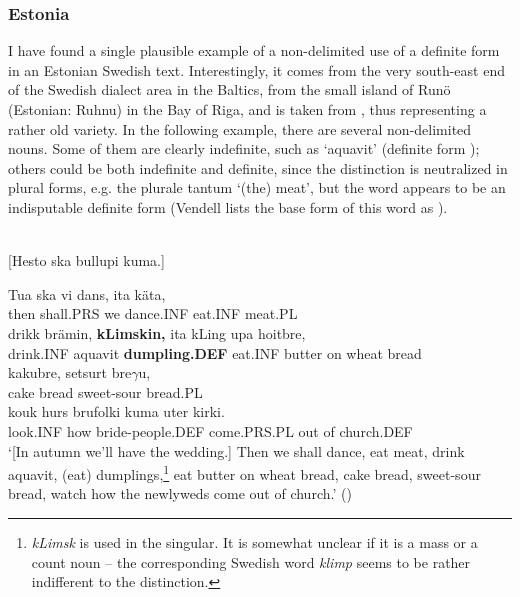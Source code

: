 \subsubsection{Estonia}
 I have found a single plausible example of a non-delimited use of a definite form in an Estonian Swedish text. Interestingly, it comes from the very south-east end of the Swedish dialect area in the Baltics, from the small island of Runö (Estonian: Ruhnu) in the Bay of Riga, and is taken from \citet{Vendell1882}, thus representing a rather old variety. In the following example, there are several non-delimited nouns. Some of them are clearly indefinite, such as  ‘aquavit’ (definite form ); others could be both indefinite and definite, since the distinction is neutralized in plural forms, e.g. the plurale tantum  ‘(the) meat’, but the word  appears to be an indisputable definite form (Vendell lists the base form of this word as ).

\ea\label{}
\\
{}[Hesto ska bullupi kuma.] 

\gll 	Tua  ska  vi  dans,  ita  käta,\\
		then   shall.PRS  we  dance.INF  eat.INF  meat.PL\\
\gll 	drikk  brämin,  \textbf{kLimskin,} ita  kLing  upa  hoitbre,\\
		drink.INF  aquavit  \textbf{dumpling.DEF  } eat.INF  butter  on  wheat bread\\
\gll 	kakubre,  setsurt  bre$\gamma $u,\\
		cake bread  sweet-sour  bread.PL\\
\gll 	kouk  hurs  brufolki  kuma  uter  kirki.\\
		look.INF  how  bride-people.DEF  come.PRS.PL  out of   church.DEF\\
\glt 	‘[In autumn we’ll have the wedding.] Then we shall dance, eat meat, drink aquavit, (eat) dumplings,\footnote{ \textit{k}\textit{L}\textit{imsk} is used in the singular. It is somewhat unclear if it is a mass or a count noun – the corresponding Swedish word \textit{klimp} seems to be rather indifferent to the distinction.  } eat butter on wheat bread, cake bread, sweet-sour bread, watch how the newlyweds come out of church.’ (\citet[76]{Vendell1882})

\z

